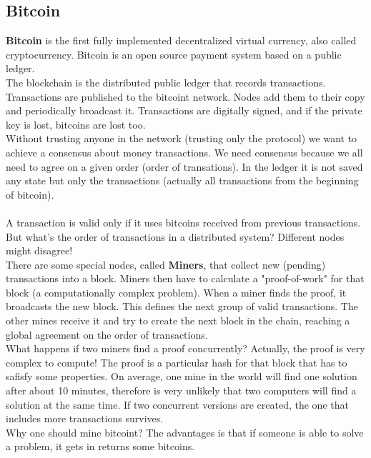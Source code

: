\documentclass[10pt,a4paper]{article}
\begin{document}
\subsection{Bitcoin}
\textbf{Bitcoin} is the first fully implemented decentralized virtual currency, also called cryptocurrency. Bitcoin is an open source payment system based on a public ledger. \\
The blockchain is the distributed public ledger that records transactions. Transactions are published to the bitcoint network. Nodes add them to their copy and periodically broadcast it. Transactions are digitally signed, and if the private key is lost, bitcoins are lost too. \\
Without trusting anyone in the network (trusting only the protocol) we want to achieve a consensus about money transactions. We need consensus because we all need to agree on a given order (order of transations). In the ledger it is not saved any state but only the transactions (actually all transactions from the beginning of bitcoin). \\ \\
A transaction is valid only if it uses bitcoins received from previous transactions. But what's the order of transactions in a distributed system? Different nodes might disagree! \\
There are some special nodes, called \textbf{Miners}, that collect new (pending) transactions into a block. Miners then have to calculate a "proof-of-work" for that block (a computationally complex problem). When a miner finds the proof, it broadcasts the new block. This defines the next group of valid transactions. The other mines receive it and try to create the next block in the chain, reaching a global agreement on the order of transactions. \\
What happens if two miners find a proof concurrently? Actually, the proof is very complex to compute! The proof is a particular hash for that block that has to safisfy some properties. On average, one mine in the world will find one solution after about 10 minutes, therefore is very unlikely that two computers will find a solution at the same time. If two concurrent versions are created, the one that includes more transactions survives. \\
Why one should mine bitcoint? The advantages is that if someone is able to solve a problem, it gets in returns some bitcoins.
\end{document}
